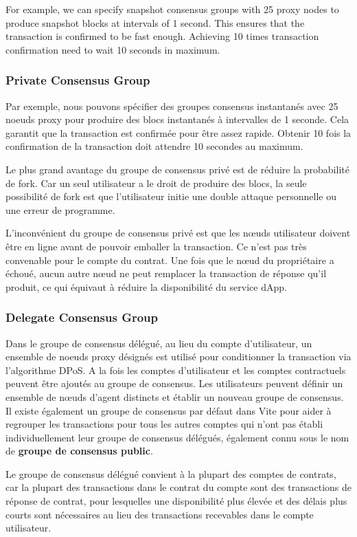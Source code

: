 \documentclass[UTF8,nofonts]{article}
\begin{document}
\begin{multicols}{2}
For example, we can specify snapshot consensus groups with 25 proxy nodes to produce snapshot blocks at intervals of 1 second. This ensures that the transaction is confirmed to be fast enough. Achieving 10 times transaction confirmation need to wait 10 seconds in maximum.

\subsubsection{Private Consensus Group}
Par exemple, nous pouvons spécifier des groupes consensus instantanés avec 25 noeuds proxy pour produire des blocs instantanés à intervalles de 1 seconde. Cela garantit que la transaction est confirmée pour être assez rapide. Obtenir 10 fois la confirmation de la transaction doit attendre 10 secondes au maximum. 

Le plus grand avantage du groupe de consensus privé est de réduire la probabilité de fork. Car un seul utilisateur a le droit de produire des blocs, la seule possibilité de fork est que l'utilisateur initie une double attaque personnelle ou une erreur de programme.

L'inconvénient du groupe de consensus privé est que les nœuds utilisateur doivent être en ligne avant de pouvoir emballer la transaction. Ce n'est pas très convenable pour le compte du contrat. Une fois que le nœud du propriétaire a échoué, aucun autre nœud ne peut remplacer la transaction de réponse qu'il produit, ce qui équivaut à réduire la disponibilité du service dApp.


\subsubsection{Delegate Consensus Group}
Dans le groupe de consensus délégué, au lieu du compte d'utilisateur, un ensemble de noeuds proxy désignés est utilisé pour conditionner la transaction via l'algorithme DPoS. A la fois les comptes d'utilisateur et les comptes contractuels peuvent être ajoutés au groupe de consensus. Les utilisateurs peuvent définir un ensemble de nœuds d'agent distincts et établir un nouveau groupe de consensus. Il existe également un groupe de consensus par défaut dans Vite pour aider à regrouper les transactions pour tous les autres comptes qui n'ont pas établi individuellement leur groupe de consensus délégués, également connu sous le nom de \textbf {groupe de consensus public}.

Le groupe de consensus délégué convient à la plupart des comptes de contrats, car la plupart des transactions dans le contrat du compte sont des transactions de réponse de contrat, pour lesquelles une disponibilité plus élevée et des délais plus courts sont nécessaires au lieu des transactions recevables dans le compte utilisateur.


\end{multicols}
\end{document}
